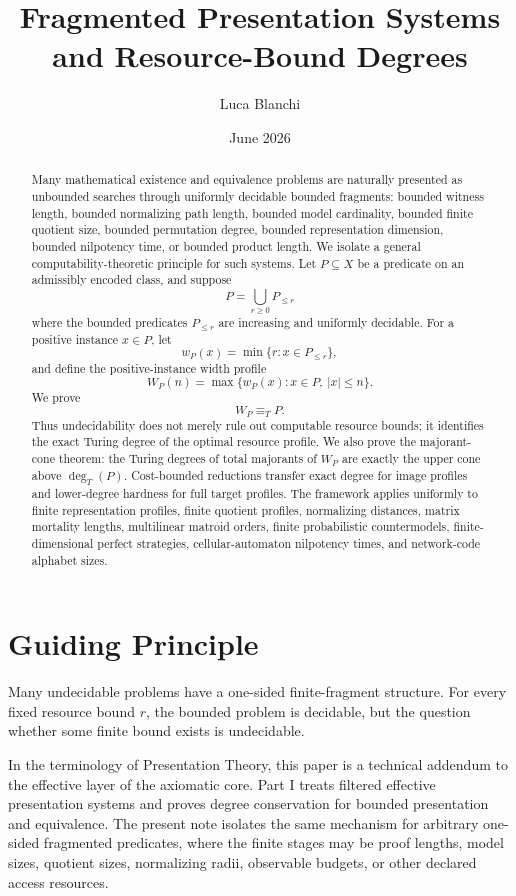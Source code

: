 \documentclass[11pt]{article}
\title{Fragmented Presentation Systems and Resource-Bound Degrees}
\author{Luca Blanchi}
\date{June 2026}
\begin{document}
\maketitle

\begin{abstract}
Many mathematical existence and equivalence problems are naturally presented as unbounded searches through uniformly decidable bounded fragments: bounded witness length, bounded normalizing path length, bounded model cardinality, bounded finite quotient size, bounded permutation degree, bounded representation dimension, bounded nilpotency time, or bounded product length. We isolate a general computability-theoretic principle for such systems. Let \(P\subseteq X\) be a predicate on an admissibly encoded class, and suppose
\[
P=\bigcup_{r\ge 0}P_{\le r}
\]
where the bounded predicates \(P_{\le r}\) are increasing and uniformly decidable. For a positive instance \(x\in P\), let
\[
w_P(x)=\min\{r:x\in P_{\le r}\},
\]
and define the positive-instance width profile
\[
W_P(n)=\max\{w_P(x):x\in P,\ |x|\le n\}.
\]
We prove
\[
W_P\equiv_T P.
\]
Thus undecidability does not merely rule out computable resource bounds; it identifies the exact Turing degree of the optimal resource profile. We also prove the majorant-cone theorem: the Turing degrees of total majorants of \(W_P\) are exactly the upper cone above \(\deg_T(P)\). Cost-bounded reductions transfer exact degree for image profiles and lower-degree hardness for full target profiles. The framework applies uniformly to finite representation profiles, finite quotient profiles, normalizing distances, matrix mortality lengths, multilinear matroid orders, finite probabilistic countermodels, finite-dimensional perfect strategies, cellular-automaton nilpotency times, and network-code alphabet sizes.
\end{abstract}

\section{Guiding Principle}

Many undecidable problems have a one-sided finite-fragment structure. For every fixed resource bound \(r\), the bounded problem is decidable, but the question whether some finite bound exists is undecidable.

In the terminology of Presentation Theory, this paper is a technical addendum to the effective layer of the axiomatic core.  Part I treats filtered effective presentation systems and proves degree conservation for bounded presentation and equivalence.  The present note isolates the same mechanism for arbitrary one-sided fragmented predicates, where the finite stages may be proof lengths, model sizes, quotient sizes, normalizing radii, observable budgets, or other declared access resources.
\end{document}
